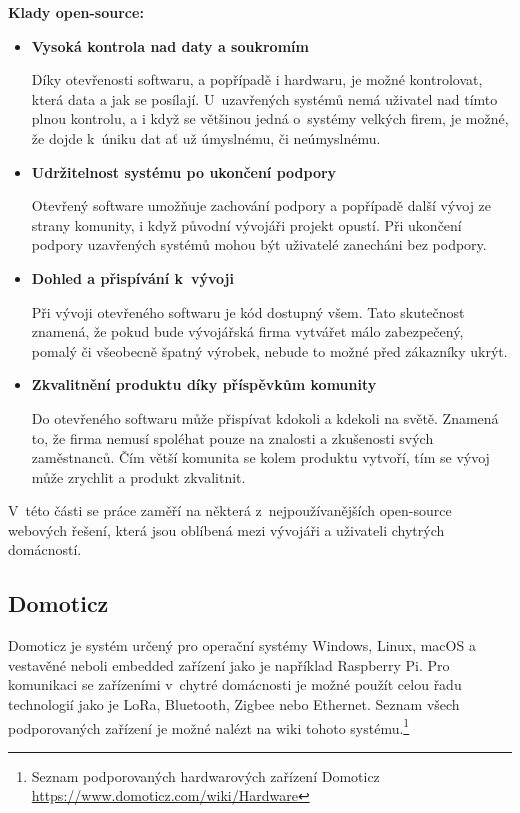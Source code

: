 \noindent\textbf{Klady open-source\cite{open-source-advantages}:}
\begin{itemize}
  \item \textbf{Vysoká kontrola nad daty a soukromím}
  
  Díky otevřenosti softwaru, a popřípadě i hardwaru, je možné kontrolovat, která data a jak se posílají. U~uzavřených systémů nemá uživatel nad tímto plnou kontrolu, a i když se většinou jedná o~systémy velkých firem, je možné, že dojde k~úniku dat ať už úmyslnému, či neúmyslnému.
  \item \textbf{Udržitelnost systému po ukončení podpory}
  
  Otevřený software umožňuje zachování podpory a popřípadě další vývoj ze strany komunity, i když původní vývojáři projekt opustí. Při ukončení podpory uzavřených systémů mohou být uživatelé zanecháni bez podpory.
  \item \textbf{Dohled a přispívání k~vývoji}
  
  Při vývoji otevřeného softwaru je kód dostupný všem. Tato skutečnost znamená, že pokud bude vývojářská firma vytvářet málo zabezpečený, pomalý či všeobecně špatný výrobek, nebude to možné před zákazníky ukrýt.
  \item \textbf{Zkvalitnění produktu díky příspěvkům komunity}
  
  Do otevřeného softwaru může přispívat kdokoli a kdekoli na světě. Znamená to, že firma nemusí spoléhat pouze na znalosti a zkušenosti svých zaměstnanců. Čím větší komunita se kolem produktu vytvoří, tím se vývoj může zrychlit a produkt zkvalitnit.
\end{itemize}

V~této části se práce zaměří na některá z~nejpoužívanějších open-source webových řešení, která jsou oblíbená mezi vývojáři a uživateli chytrých domácností.

\subsection*{Domoticz}
Domoticz je systém určený pro operační systémy Windows, Linux, macOS a vestavěné neboli embedded zařízení jako je například Raspberry Pi. Pro komunikaci se zařízeními v~chytré domácnosti je možné použít celou řadu technologií jako je LoRa, Bluetooth, Zigbee nebo Ethernet. Seznam všech podporovaných zařízení je možné nalézt na wiki tohoto systému.\footnote{Seznam podporovaných hardwarových zařízení Domoticz \url{https://www.domoticz.com/wiki/Hardware}}

